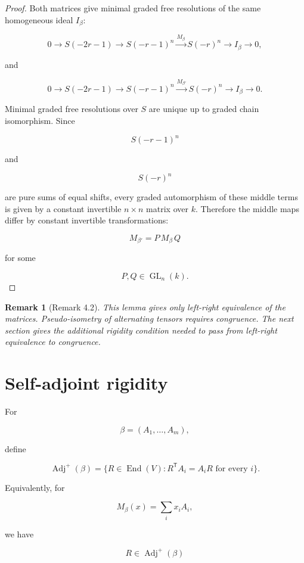 \documentclass[11pt]{article}
\newtheorem{remark}[theorem]{Remark}
\begin{document}
\begin{proof}

Both matrices give minimal graded free resolutions of the same homogeneous ideal $I_\beta$:

\[
0
\to
S(-2r-1)
\to
S(-r-1)^n
\xrightarrow{M_\beta}
S(-r)^n
\to
I_\beta
\to0,
\]

and

\[
0
\to
S(-2r-1)
\to
S(-r-1)^n
\xrightarrow{M_{\beta'}}
S(-r)^n
\to
I_\beta
\to0.
\]

Minimal graded free resolutions over $S$ are unique up to graded chain isomorphism. Since

\[
S(-r-1)^n
\]

and

\[
S(-r)^n
\]

are pure sums of equal shifts, every graded automorphism of these middle terms is given by a constant invertible $n\times n$ matrix over $k$. Therefore the middle maps differ by constant invertible transformations:

\[
M_{\beta'}=P\,M_\beta\,Q
\]

for some

\[
P,Q\in \operatorname{GL}_n(k).
\]

\end{proof}

\begin{remark}[Remark 4.2]

This lemma gives only left-right equivalence of the matrices. Pseudo-isometry of alternating tensors requires congruence. The next section gives the additional rigidity condition needed to pass from left-right equivalence to congruence.

\end{remark}

\section{Self-adjoint rigidity}

For

\[
\beta=(A_1,\ldots,A_m),
\]

define

\[
\operatorname{Adj}^+(\beta)
=
\{R\in\operatorname{End}(V):R^{\mathsf T}A_i=A_iR\text{ for every }i\}.
\]

Equivalently, for

\[
M_\beta(x)=\sum_i x_iA_i,
\]

we have

\[
R\in\operatorname{Adj}^+(\beta)
\]
\end{document}
